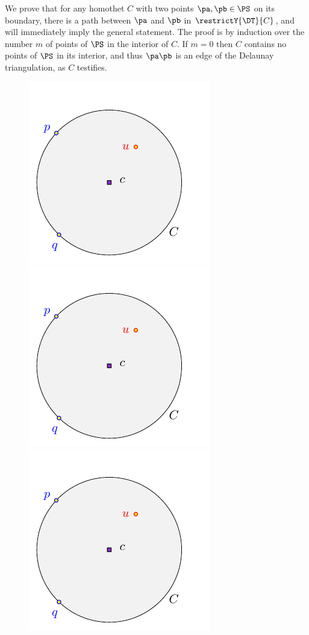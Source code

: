         We prove that for any homothet $C$ with two points
        $\pa,\pb\in \PS$ on its boundary, there is a path between $\pa$
        and $\pb$ in $\restrictY{\DT}{C}$, and  will
        immediately imply the general statement. The proof is by induction
        over the number $m$ of points of $\PS$ in the interior of $C$. If
        $m=0$ then $C$ contains no points of $\PS$ in its interior, and
        thus $\pa \pb$ is an edge of the Delaunay triangulation, as $C$
        testifies.
        
        \begin{figure}[h]
                \phantom{}\hfill%
                \includegraphics[page=1]{../figs/shrink}%
                \hfill%
                \includegraphics[page=2]{../figs/shrink}%
                \hfill%
                \includegraphics[page=3]{../figs/shrink}%

\end{figure}
